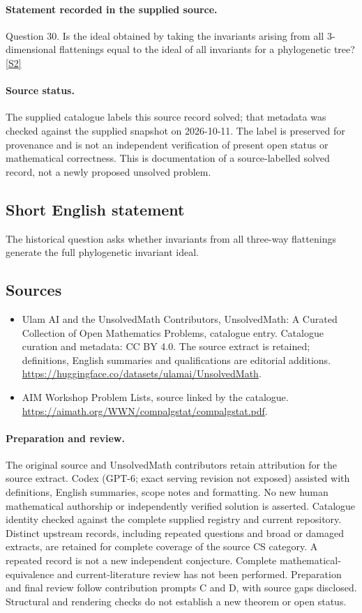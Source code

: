 \documentclass[11pt]{article}
\begin{document}
\paragraph{Statement recorded in the supplied source.}
Question 30. Is the ideal obtained by taking the invariants arising from all 3-dimensional flattenings equal to the ideal of all invariants for a phylogenetic tree? \href{https://aimath.org/WWN/compalgstat/compalgstat.pdf}{[S2]}
\paragraph{Source status.}
The supplied catalogue labels this source record solved; that metadata was checked against the supplied snapshot on 2026-10-11. The label is preserved for provenance and is not an independent verification of present open status or mathematical correctness. This is documentation of a source-labelled solved record, not a newly proposed unsolved problem.
\subsection{Short English statement}
The historical question asks whether invariants from all three-way flattenings generate the full phylogenetic invariant ideal.
\subsection{Sources}
\begin{itemize}
\item[S1] Ulam AI and the UnsolvedMath Contributors, UnsolvedMath: A Curated Collection of Open Mathematics Problems, catalogue entry. Catalogue curation and metadata: CC BY 4.0. The source extract is retained; definitions, English summaries and qualifications are editorial additions.
\url{https://huggingface.co/datasets/ulamai/UnsolvedMath}.
\item[S2] AIM Workshop Problem Lists, source linked by the catalogue.
\url{https://aimath.org/WWN/compalgstat/compalgstat.pdf}.
\end{itemize}
\paragraph{Preparation and review.}
The original source and UnsolvedMath contributors retain attribution for the source extract. Codex (GPT-6; exact serving revision not exposed) assisted with definitions, English summaries, scope notes and formatting. No new human mathematical authorship or independently verified solution is asserted. Catalogue identity checked against the complete supplied registry and current repository. Distinct upstream records, including repeated questions and broad or damaged extracts, are retained for complete coverage of the source CS category. A repeated record is not a new independent conjecture. Complete mathematical-equivalence and current-literature review has not been performed. Preparation and final review follow contribution prompts C and D, with source gaps disclosed. Structural and rendering checks do not establish a new theorem or open status.
\label{end:statement}
\end{document}
